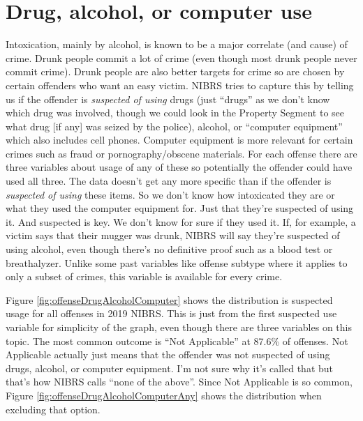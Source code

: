 \documentclass[
  12pt,
  openany]{book}
\begin{document}
\section{Drug, alcohol, or computer use}\label{drug-alcohol-or-computer-use}

Intoxication, mainly by alcohol, is known to be a major correlate (and cause) of crime. Drunk people commit a lot of crime (even though most drunk people never commit crime). Drunk people are also better targets for crime so are chosen by certain offenders who want an easy victim. NIBRS tries to capture this by telling us if the offender is \emph{suspected of using} drugs (just ``drugs'' as we don't know which drug was involved, though we could look in the Property Segment to see what drug {[}if any{]} was seized by the police), alcohol, or ``computer equipment'' which also includes cell phones. Computer equipment is more relevant for certain crimes such as fraud or pornography/obscene materials. For each offense there are three variables about usage of any of these so potentially the offender could have used all three. The data doesn't get any more specific than if the offender is \emph{suspected of using} these items. So we don't know how intoxicated they are or what they used the computer equipment for. Just that they're suspected of using it. And suspected is key. We don't know for sure if they used it. If, for example, a victim says that their mugger was drunk, NIBRS will say they're suspected of using alcohol, even though there's no definitive proof such as a blood test or breathalyzer. Unlike some past variables like offense subtype where it applies to only a subset of crimes, this variable is available for every crime.

Figure \ref{fig:offenseDrugAlcoholComputer} shows the distribution is suspected usage for all offenses in 2019 NIBRS. This is just from the first suspected use variable for simplicity of the graph, even though there are three variables on this topic. The most common outcome is ``Not Applicable'' at 87.6\% of offenses. Not Applicable actually just means that the offender was not suspected of using drugs, alcohol, or computer equipment. I'm not sure why it's called that but that's how NIBRS calls ``none of the above''. Since Not Applicable is so common, Figure \ref{fig:offenseDrugAlcoholComputerAny} shows the distribution when excluding that option.
\end{document}
